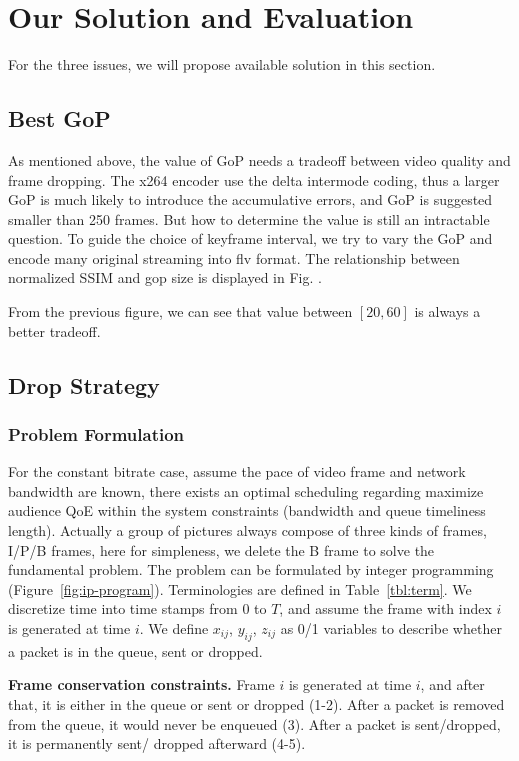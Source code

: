 \newcommand{\Mod}[1]{\text{ (mod } #1\text{)}}
\section{Our Solution and Evaluation}
For the three issues, we will propose available solution in this section.
\subsection{Best GoP}
As mentioned above, the value of GoP needs a tradeoff between video quality and frame dropping. The x264 encoder use the delta intermode coding, thus a larger GoP is much likely to introduce the accumulative errors, and GoP is suggested smaller than 250 frames. But how to determine the value is still an intractable question. To guide the choice of keyframe interval, we try to vary the GoP and encode many original streaming into flv format. The relationship between normalized SSIM and gop size is displayed in Fig. .

From the previous figure, we can see that value between $[20,60]$ is always a better tradeoff.

\subsection{Drop Strategy}



\subsubsection{Problem Formulation}
For the constant bitrate case, assume the pace of video frame and network bandwidth are known, there exists an optimal scheduling regarding maximize audience QoE within the system constraints (bandwidth and queue timeliness length). Actually a group of pictures always compose of three kinds of frames, I/P/B frames, here for simpleness, we delete the B frame to solve the fundamental problem. The problem can be formulated by integer programming (Figure~\ref{fig:ip-program}). Terminologies are defined in Table~\ref{tbl:term}. We discretize time into time stamps from $0$ to $T$, and assume the frame with index $i$ is generated at time $i$. We define $x_{ij}$, $y_{ij}$, $z_{ij}$ as 0/1 variables to describe whether a packet is in the queue, sent or dropped.

\textbf{Frame conservation constraints.}
Frame $i$ is generated at time $i$, and after that, it is either in the queue or sent or dropped (1-2).
After a packet is removed from the queue, it would never be enqueued (3).
After a packet is sent/dropped, it is permanently sent/ dropped afterward (4-5).

